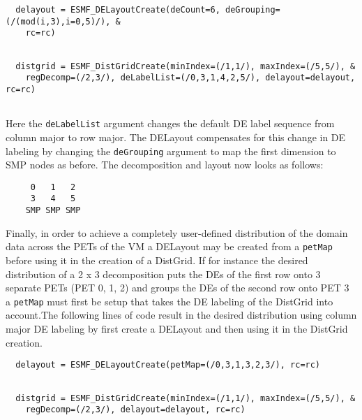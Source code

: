  \begin{verbatim}
  delayout = ESMF_DELayoutCreate(deCount=6, deGrouping=(/(mod(i,3),i=0,5)/), &
    rc=rc)
 
\end{verbatim}
 

 \begin{verbatim}
  distgrid = ESMF_DistGridCreate(minIndex=(/1,1/), maxIndex=(/5,5/), &
    regDecomp=(/2,3/), deLabelList=(/0,3,1,4,2,5/), delayout=delayout, rc=rc)
 
\end{verbatim}
 

   Here the {\tt deLabelList} argument changes the default DE label sequence from
   column major to row major. The DELayout compensates for this change in DE
   labeling by changing the {\tt deGrouping} argument to map the first dimension
   to SMP nodes as before. The decomposition and layout now looks as follows:
   \begin{verbatim}
     0   1   2
     3   4   5
    SMP SMP SMP
   \end{verbatim}
   
   Finally, in order to achieve a completely user-defined distribution of the
   domain data across the PETs of the VM a DELayout may be created from a
   {\tt petMap} before using it in the creation of a DistGrid. If for
   instance the desired distribution of a 2 x 3 decomposition puts the DEs of 
   the first row onto 3 separate PETs (PET 0, 1, 2) and groups the DEs of 
   the second row onto PET 3 a {\tt petMap} must first be setup that
   takes the DE labeling of the DistGrid into account.The following lines of 
   code result in the desired distribution using column major DE labeling by 
   first create a DELayout and then using it in the DistGrid creation. 

 \begin{verbatim}
  delayout = ESMF_DELayoutCreate(petMap=(/0,3,1,3,2,3/), rc=rc)
 
\end{verbatim}
 

 \begin{verbatim}
  distgrid = ESMF_DistGridCreate(minIndex=(/1,1/), maxIndex=(/5,5/), &
    regDecomp=(/2,3/), delayout=delayout, rc=rc)
 
\end{verbatim}
 
